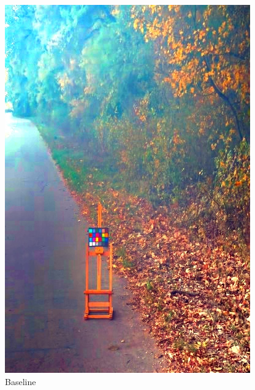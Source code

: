 \documentclass[12pt]{article}
\begin{document}
\begin{figure}[!h]
\begin{minipage}[t]{0.24\linewidth}
        \includegraphics[width=0.9\linewidth]{sample_pictures/after_OHAZY_Baseline.jpg}
        \caption*{Baseline}
    \end{minipage}
    \begin{minipage}[t]{0.24\linewidth}
        \centering

\end{minipage}
\end{figure}
\end{document}
